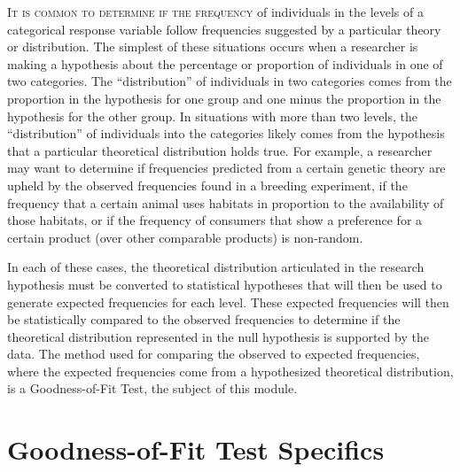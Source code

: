 \documentclass[10pt,openany]{book}\usepackage[]{graphicx}\usepackage[]{color}
\begin{document}
\lettrine{I}{t is common to determine if the frequency} of individuals in the levels of a categorical response variable follow frequencies suggested by a particular theory or distribution.  The simplest of these situations occurs when a researcher is making a hypothesis about the percentage or proportion of individuals in one of two categories.  The ``distribution'' of individuals in two categories comes from the proportion in the hypothesis for one group and one minus the proportion in the hypothesis for the other group.  In situations with more than two levels, the ``distribution'' of individuals into the categories likely comes from the hypothesis that a particular theoretical distribution holds true.  For example, a researcher may want to determine if frequencies predicted from a certain genetic theory are upheld by the observed frequencies found in a breeding experiment, if the frequency that a certain animal uses habitats in proportion to the availability of those habitats, or if the frequency of consumers that show a preference for a certain product (over other comparable products) is non-random.

In each of these cases, the theoretical distribution articulated in the research hypothesis must be converted to statistical hypotheses that will then be used to generate expected frequencies for each level.  These expected frequencies will then be statistically compared to the observed frequencies to determine if the theoretical distribution represented in the null hypothesis is supported by the data.  The method used for comparing the observed to expected frequencies, where the expected frequencies come from a hypothesized theoretical distribution, is a Goodness-of-Fit Test, the subject of this module.

\section{Goodness-of-Fit Test Specifics}
\vspace{-12pt}
\end{document}
